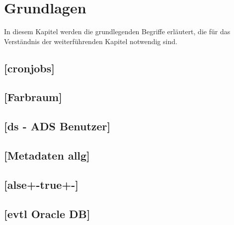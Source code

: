 \section{Grundlagen}
In diesem Kapitel werden die grundlegenden Begriffe erläutert, die für das Verständnis der weiterführenden Kapitel notwendig sind.





\subsection{[cronjobs]}

\subsection{[Farbraum]}
\subsection{[ds - ADS Benutzer]}
\subsection{[Metadaten allg]}
\subsection{[alse+-true+-]}
\subsection{[evtl Oracle DB]}







